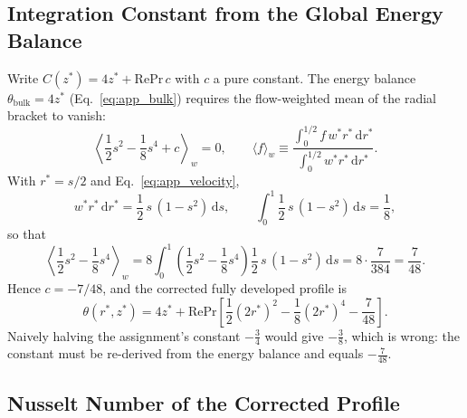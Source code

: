 \documentclass[12pt,a4paper]{article}
\newcommand{\Rey}{\text{Re}}
\newcommand{\Pran}{\text{Pr}}
\begin{document}
\subsection{Integration Constant from the Global Energy Balance}

Write $C(z^*)=4z^*+\Rey\Pran\,c$ with $c$ a pure constant. The energy balance
$\theta_{\text{bulk}}=4z^*$ (Eq.~\eqref{eq:app_bulk}) requires the flow-weighted mean of the
radial bracket to vanish:
\begin{equation}
    \left\langle \frac12 s^2-\frac18 s^4 + c \right\rangle_w = 0,
    \qquad
    \langle f\rangle_w \equiv
    \frac{\int_0^{1/2} f\,w^*r^*\,\mathrm{d}r^*}{\int_0^{1/2} w^*r^*\,\mathrm{d}r^*}.
\end{equation}
With $r^*=s/2$ and Eq.~\eqref{eq:app_velocity},
\begin{equation}
    w^*r^*\,\mathrm{d}r^* = \frac12\,s\,(1-s^2)\,\mathrm{d}s,
    \qquad
    \int_0^1 \frac12\,s\,(1-s^2)\,\mathrm{d}s = \frac18 ,
\end{equation}
so that
\begin{equation}
    \left\langle \frac12 s^2-\frac18 s^4 \right\rangle_w
    = 8\int_0^1\left(\frac12 s^2-\frac18 s^4\right)\frac12\,s\,(1-s^2)\,\mathrm{d}s
    = 8\cdot\frac{7}{384}
    = \frac{7}{48}.
\end{equation}
Hence $c=-7/48$, and the corrected fully developed profile is
\begin{equation}
    \theta(r^*,z^*) =
    4z^* + \Rey\Pran\left[\frac{1}{2}(2r^*)^2
    - \frac{1}{8}(2r^*)^4 - \frac{7}{48}\right].
    \label{eq:app_corrected_temperature}
\end{equation}
Naively halving the assignment's constant $-\tfrac34$ would give $-\tfrac38$, which is wrong: the
constant must be re-derived from the energy balance and equals $-\tfrac{7}{48}$.

\subsection{Nusselt Number of the Corrected Profile}
\end{document}
